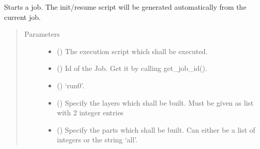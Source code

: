 \documentclass[letterpaper,10pt,english,openany,oneside]{sphinxmanual}
\begin{document}
\begin{fulllineitems}
\begin{fulllineitems}
\end{fulllineitems}


\begin{fulllineitems}
\label{\detokenize{_modules/AconitySTUDIO_client:AconitySTUDIO_client.AconitySTUDIO_client.start_job}}
Starts a job. The init/resume script will be generated automatically from the current job.
\begin{quote}\begin{description}
\item[{Parameters}] \leavevmode\begin{itemize}
\item {} 
 () \textendash{} The execution script which shall be executed.

\item {} 
 () \textendash{} Id of the Job. Get it by calling get\_job\_id().

\item {} 
 () \textendash{} ‘run0’.

\item {} 
 () \textendash{} Specify the layers which shall be built. Must be given as list with 2 integer entries

\item {} 
 () \textendash{} Specify the parts which shall be built. Can either be a list of integers or the string ‘all’.

\end{itemize}

\end{description}\end{quote}

\end{fulllineitems}


\end{fulllineitems}
\end{document}

